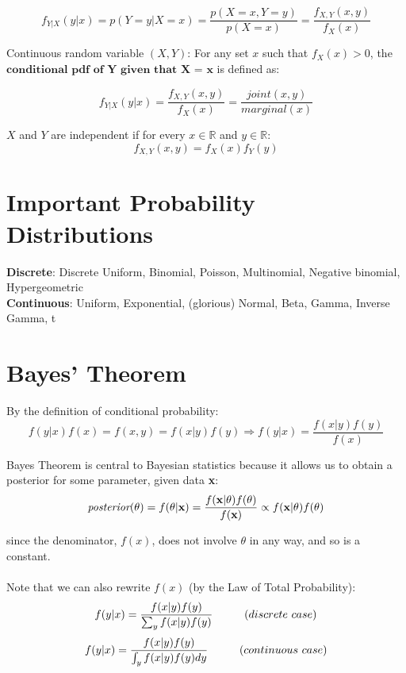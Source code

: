 \documentclass[12pt]{book}
\begin{document}
\begin{equation}
f_{Y|X}(y|x) = p(Y=y | X=x) = \frac{p(X=x, Y=y)}{p(X=x)}  =
\frac{f_{X,Y}(x,y)}{f_X(x)}
\end{equation}

Continuous random variable $(X,Y)$: For any set $x$ such that $f_X(x) > 0$, the $\textbf{conditional pdf of Y given that X = x}$ is defined as: 

\begin{equation}
f_{Y|X}(y|x) = \frac{f_{X,Y}(x,y)}{f_X(x)} = \frac{joint(x,y)}{marginal(x)} 
\end{equation}

$X$ and $Y$ are independent if for every $x \in \mathbb{R}$ and $y \in \mathbb{R}$:
\begin{equation}
f_{X,Y}(x,y) = f_X(x)f_Y(y)
\end{equation}




\section{Important Probability Distributions}
\textbf{Discrete}: Discrete Uniform, Binomial, Poisson, Multinomial,
Negative binomial, Hypergeometric
\\
\textbf{Continuous}: Uniform, Exponential, (glorious) Normal, Beta, Gamma,
Inverse Gamma, t
\\




\section{Bayes' Theorem}
By the definition of conditional probability:
\begin{equation}
f(y|x)f(x) = f(x,y) = f(x|y)f(y)  \Longrightarrow f(y|x) = \frac{f(x|y)f(y)}{f(x)}
\end{equation}

Bayes Theorem is central to Bayesian statistics because it allows
us to obtain a posterior for some parameter, given data \textbf{x}:
\begin{equation}
\textit{posterior}(\theta) = f(\theta|\textbf{x}) = \frac{f(\textbf{\textbf{x}}|\theta)f(\theta)}{f(\textbf{x})} \propto f(\textbf{x}|\theta)f(\theta)
\end{equation}

since the denominator, $f(x)$, does not involve $\theta$ in any way, and so is a constant. 
\\\\
Note that we can also rewrite $f(x)$ (by the Law of Total Probability):
\begin{equation}
f(y|x) = \frac{f(x|y)f(y)}{\sum_{y}f(x|y)f(y)} \hspace{10 mm} (discrete \  case)
\end{equation}
\begin{equation}
f(y|x) = \frac{f(x|y)f(y)}{\int_{y}f(x|y)f(y)dy} \hspace{10 mm} (continuous \ case)
\end{equation}
\end{document}
